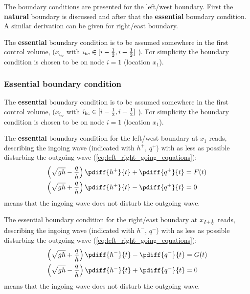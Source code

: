 The boundary conditions are presented for the left/west boundary.
First the \textbf{natural} boundary is discussed and after that the \textbf{essential} boundary condition.
A similar derivation can be given for right/east boundary.

The \textbf{essential} boundary condition is to be assumed somewhere in the first control volume, ($x_{i_{bc}}$ with $i_{bc} \in [i-\frac{1}{2}, i+\frac{1}{2}]$ ).
For simplicity the boundary condition is chosen to be on node $i=1$ (location $x_{1}$).

\subsubsection{Essential boundary condition}
The \textbf{essential} boundary condition is to be assumed somewhere in the first control volume, ($x_{i_{bc}}$ with $i_{bc} \in [i-\frac{1}{2}, i+\frac{1}{2}]$ ).
For simplicity the boundary condition is chosen to be on node $i=1$ (location $x_{1}$).

The \textbf{essential} boundary condition for the left/west boundary at $x_{1}$ reads, describing the ingoing wave (indicated with $h^+$, $q^+$) with as less as possible disturbing the outgoing wave (\autoref{eq:left_right_going_equations}):
\begin{align}
    \left(\sqrt{gh} - \frac{q}{h}\right) \pdiff{h^{+}}{t} + \pdiff{q^{+}}{t} & = F(t)
    \label{eq:essential_conv_1}
    \\
    \left(\sqrt{gh} + \frac{q}{h}\right) \pdiff{h^{+}}{t} - \pdiff{q^{+}}{t} & = 0
    \label{eq:essential_conv_2}
\end{align}
 means that the ingoing wave does not disturb the outgoing wave.

The essential boundary condition for the right/east boundary at $x_{I+\frac{1}{2}}$ reads, describing the ingoing wave (indicated with $h^-$, $q^-$) with as less as possible disturbing the outgoing wave (\autoref{eq:left_right_going_equations}):\begin{align}
    \left(\sqrt{gh} + \frac{q}{h}\right) \pdiff{h^{-}}{t} - \pdiff{q^{-}}{t} & = G(t)
    \label{eq:essential_conv_3}
    \\
    \left(\sqrt{gh} - \frac{q}{h}\right) \pdiff{h^{-}}{t} + \pdiff{q^{-}}{t} & = 0
    \label{eq:essential_conv_4}
\end{align}
 means that the ingoing wave does not disturb the outgoing wave.


